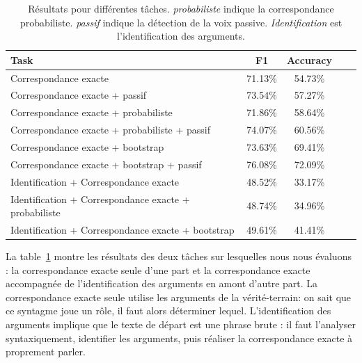 \begin{table}[ht]
    \centering
    \begin{tabular}{lcccc}
        \toprule
        Task                                                  & F1        & Accuracy \\
        \midrule
        Correspondance exacte                                 & 71.13\%   & 54.73\%  \\
        Correspondance exacte + passif                        & 73.54\%   & 57.27\%  \\
        Correspondance exacte + probabiliste                  & 71.86\%   & 58.64\%  \\
        Correspondance exacte + probabiliste + passif         & 74.07\%   & 60.56\%  \\
        Correspondance exacte + bootstrap                     & 73.63\%   & 69.41\%  \\
        Correspondance exacte + bootstrap + passif            & 76.08\%   & 72.09\%  \\
        \midrule
        Identification + Correspondance exacte                & 48.52\%   & 33.17\%  \\
        Identification + Correspondance exacte + probabiliste & 48.74\%   & 34.96\%  \\
        Identification + Correspondance exacte + bootstrap    & 49.61\%   & 41.41\%  \\
        \bottomrule
    \end{tabular}

    \caption{\label{table:results}Résultats pour différentes tâches. \emph{probabiliste} indique la correspondance probabiliste. \emph{passif} indique la détection de la voix passive. \emph{Identification} est l'identification des arguments.}

\end{table}

La table~\ref{table:results} montre les résultats des deux tâches sur
lesquelles nous nous évaluons : la correspondance exacte seule d'une part et la
correspondance exacte accompagnée de l'identification des arguments en amont
d'autre part. La correspondance exacte seule utilise les arguments de la
vérité-terrain: on sait que ce syntagme joue un rôle, il faut alors déterminer
lequel.  L'identification des arguments implique que le texte de départ est une
phrase brute : il faut l'analyser syntaxiquement, identifier les arguments,
puis réaliser la correspondance exacte à proprement parler.

